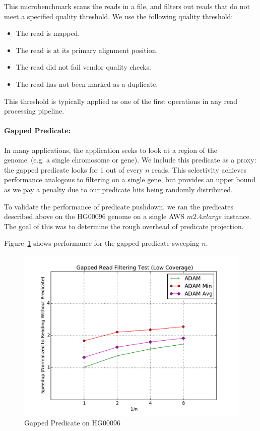 \documentclass{acm_proc_article-sp}
\begin{document}
This microbenchmark scans the reads in a file, and filters out reads that do not meet a specified quality threshold. We use the following
quality threshold:

\begin{itemize}
\item The read is mapped.
\item The read is at its primary alignment position.
\item The read did not fail vendor quality checks.
\item The read has not been marked as a duplicate.
\end{itemize}
This threshold is typically applied as one of the first operations in any read processing pipeline.

\paragraph{Gapped Predicate:}
\label{sec:gapped-predicate}

In many applications, the application seeks to look at a region of the genome~(e.g. a single chromosome or gene). We include this
predicate as a proxy: the gapped predicate looks for 1 out of every $n$ reads. This selectivity achieves performance analogous to filtering
on a single gene, but provides an upper bound as we pay a penalty due to our predicate hits being randomly distributed.

To validate the performance of predicate pushdown, we ran the predicates described above on the HG00096 genome on a
single AWS $m2.4xlarge$ instance. The goal of this was to determine the rough overhead of predicate projection.

Figure~\ref{fig:gapped-filter} shows performance for the gapped predicate sweeping $n$.

\begin{figure}[h]
\begin{center}
\includegraphics[width=\linewidth]{microbenchmarks/gapped_predicate_low_coverage.pdf}
\end{center}
\caption{Gapped Predicate on HG00096}
\label{fig:gapped-filter}
\end{figure}
\end{document}
